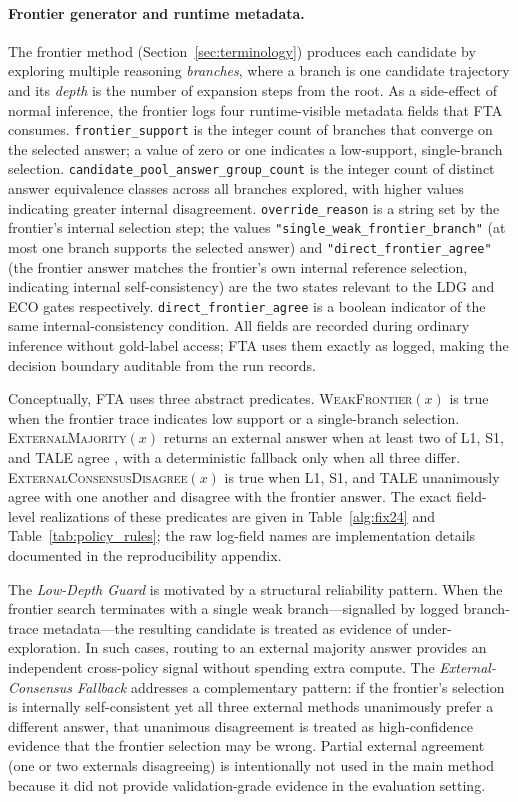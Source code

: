 \paragraph{Frontier generator and runtime metadata.}
The frontier method (Section~\ref{sec:terminology}) produces each candidate by exploring
multiple reasoning \emph{branches}, where a branch is one candidate trajectory and its
\emph{depth} is the number of expansion steps from the root.
As a side-effect of normal inference, the frontier logs four runtime-visible metadata
fields that FTA consumes.
\texttt{frontier\_support} is the integer count of branches that converge on the selected
answer; a value of zero or one indicates a low-support, single-branch selection.
\texttt{candidate\_pool\_answer\_group\_count} is the integer count of distinct answer
equivalence classes across all branches explored, with higher values indicating greater
internal disagreement.
\texttt{override\_reason} is a string set by the frontier's internal selection step;
the values \texttt{"single\_weak\_frontier\_branch"} (at most one branch supports the
selected answer) and \texttt{"direct\_frontier\_agree"} (the frontier answer matches the
frontier's own internal reference selection, indicating internal self-consistency) are the
two states relevant to the LDG and ECO gates respectively.
\texttt{direct\_frontier\_agree} is a boolean indicator of the same internal-consistency
condition.
All fields are recorded during ordinary inference without gold-label access; FTA uses them
exactly as logged, making the decision boundary auditable from the run records.

Conceptually, FTA uses three abstract predicates.
\textsc{WeakFrontier}$(x)$ is true when the frontier trace indicates low support
or a single-branch selection.
\textsc{ExternalMajority}$(x)$ returns an external answer when at least two of
L1, S1, and TALE agree \citep{wang2023selfconsistency,muennighoff2025s1,han2025token},
with a deterministic fallback only when all three differ.
\textsc{ExternalConsensusDisagree}$(x)$ is true when L1, S1, and TALE
unanimously agree with one another and disagree with the frontier answer.
The exact field-level realizations of these predicates are given in
Table~\ref{alg:fix24} and Table~\ref{tab:policy_rules}; the raw log-field
names are implementation details documented in the reproducibility appendix.

The \emph{Low-Depth Guard} is motivated by a structural reliability pattern.
When the frontier search terminates with a single weak branch---signalled by
logged branch-trace metadata---the resulting candidate is treated as evidence
of under-exploration.
In such cases, routing to an external majority answer provides an independent
cross-policy signal without spending extra compute.
The \emph{External-Consensus Fallback} addresses a complementary pattern: if
the frontier's selection is internally self-consistent yet all three external
methods unanimously prefer a different answer, that unanimous disagreement is
treated as high-confidence evidence that the frontier selection may be wrong.
Partial external agreement (one or two externals disagreeing) is intentionally
not used in the main method because it did not provide validation-grade evidence
in the evaluation setting.

